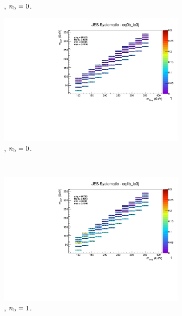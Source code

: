 \begin{figure}[ht!]
\begin{subfigure}[b]{0.32\textwidth}
    \caption{\njlow, $n_{\text{b}} = 0$.}
  \end{subfigure}
  \begin{subfigure}[b]{0.32\textwidth}
    \includegraphics[width=\textwidth, page=1]{Figs/sms/t2cc/v37_2/systs/T2cc_JES_eq0b_le3j.pdf}
    \caption{\njlow, $n_{\text{b}} = 0$.}
    \label{fig:sms-jes-t2cc-le3j-0b}
  \end{subfigure}\\
  \begin{subfigure}[b]{0.32\textwidth}
    \includegraphics[width=\textwidth, page=12]{Figs/sms/t2cc/v37_2/systs/T2cc_JES_eq1b_le3j.pdf}
    \caption{\njlow, $n_{\text{b}} = 1$.}
  \end{subfigure}
  \begin{subfigure}[b]{0.32\textwidth}

\end{subfigure}
\end{figure}
